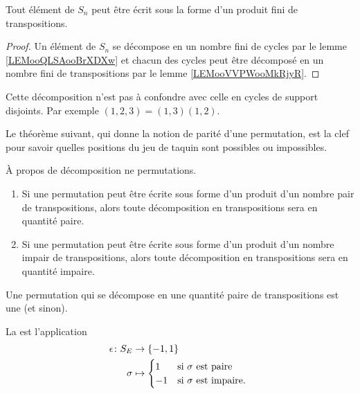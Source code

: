 \begin{proposition} \label{PropPWIJbu}
	Tout élément de \( S_n\) peut être écrit sous la forme d'un produit fini de transpositions.
\end{proposition}

\begin{proof}
	Un élément de \( S_n\) se décompose en un nombre fini de cycles par le lemme \ref{LEMooQLSAooBrXDXw} et chacun des cycles peut être décomposé en un nombre fini de transpositions par le lemme \ref{LEMooVVPWooMkRjyR}.
\end{proof}

Cette décomposition n'est pas à confondre avec celle en cycles de support disjoints. Par exemple \( (1,2,3)=(1,3)(1,2)\).

Le théorème suivant, qui donne la notion de parité d'une permutation, est la clef pour savoir quelles positions du jeu de taquin sont possibles ou impossibles\cite{BIBooGLIWooAggcqh,BIBooCDDXooYWCtNZ}.
\begin{propositionDef}\label{PROPooKRHEooAxtmRv}
	À propos de décomposition ne permutations.
	\begin{enumerate}
		\item
		      Si une permutation peut être écrite sous forme d'un produit d'un nombre pair de transpositions, alors toute décomposition en transpositions sera en quantité paire.
		\item
		      Si une permutation peut être écrite sous forme d'un produit d'un nombre impair de transpositions, alors toute décomposition en transpositions sera en quantité impaire.
	\end{enumerate}
	Une permutation qui se décompose en une quantité paire de transpositions est une  (et  sinon).
\end{propositionDef}


\begin{definition}       \label{DEFooNHXSooQzCPzD}
	La  est l'application
	\begin{equation}
		\begin{aligned}
			\epsilon\colon S_E & \to \{ -1,1 \}                                   \\
			\sigma             & \mapsto \begin{cases}
				                             1  & \text{si \( \sigma\) est paire }    \\
				                             -1 & \text{si \( \sigma\) est impaire. }
			                             \end{cases}
		\end{aligned}
	\end{equation}
\end{definition}


